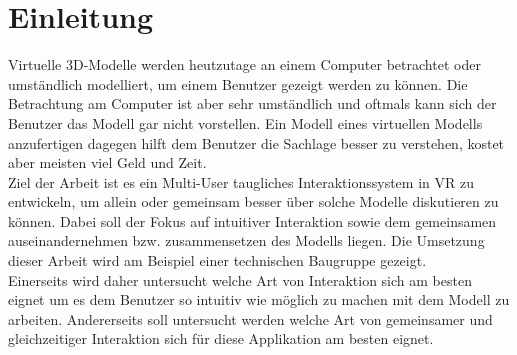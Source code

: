 \chapter{Einleitung}
\label{ch:Einleitung}

Virtuelle 3D-Modelle werden heutzutage an einem Computer betrachtet oder umständlich modelliert, um einem Benutzer gezeigt werden zu können. Die Betrachtung am Computer ist aber sehr umständlich und oftmals kann sich der Benutzer das Modell gar nicht vorstellen. Ein Modell eines virtuellen Modells anzufertigen dagegen hilft dem Benutzer die Sachlage besser zu verstehen, kostet aber meisten viel Geld und Zeit. \\

\noindent Ziel der Arbeit ist es ein Multi-User taugliches Interaktionssystem in VR zu entwickeln, um allein oder gemeinsam besser über solche Modelle diskutieren zu können. Dabei soll der Fokus auf intuitiver Interaktion sowie dem gemeinsamen auseinandernehmen bzw. zusammensetzen des Modells liegen. Die Umsetzung dieser Arbeit wird am Beispiel einer technischen Baugruppe gezeigt. \\

\noindent Einerseits wird daher untersucht welche Art von Interaktion sich am besten eignet um es dem Benutzer so intuitiv wie möglich zu machen mit dem Modell zu arbeiten. Andererseits soll untersucht werden welche Art von gemeinsamer und gleichzeitiger Interaktion sich für diese Applikation am besten eignet.